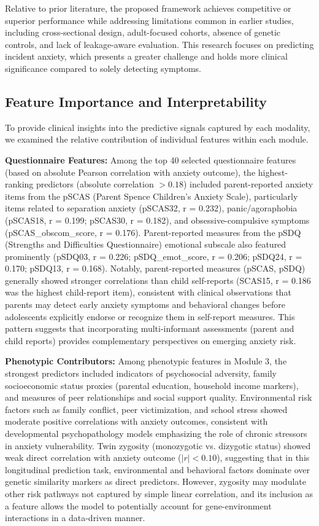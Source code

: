 \documentclass[10pt,letterpaper]{article}
\begin{document}
Relative to prior literature, the proposed framework achieves competitive or superior performance while addressing limitations common in earlier studies, including cross-sectional design, adult-focused cohorts, absence of genetic controls, and lack of leakage-aware evaluation. This research focuses on predicting incident anxiety, which presents a greater challenge and holds more clinical significance compared to solely detecting symptoms.

\subsection*{Feature Importance and Interpretability}

To provide clinical insights into the predictive signals captured by each modality, we examined the relative contribution of individual features within each module.

\textbf{Questionnaire Features:} Among the top 40 selected questionnaire features (based on absolute Pearson correlation with anxiety outcome), the highest-ranking predictors (absolute correlation $> 0.18$) included parent-reported anxiety items from the pSCAS (Parent Spence Children's Anxiety Scale), particularly items related to separation anxiety (pSCAS32, r = 0.232), panic/agoraphobia (pSCAS18, r = 0.199; pSCAS30, r = 0.182), and obsessive-compulsive symptoms (pSCAS\_obscom\_score, r = 0.176). Parent-reported measures from the pSDQ (Strengths and Difficulties Questionnaire) emotional subscale also featured prominently (pSDQ03, r = 0.226; pSDQ\_emot\_score, r = 0.206; pSDQ24, r = 0.170; pSDQ13, r = 0.168). Notably, parent-reported measures (pSCAS, pSDQ) generally showed stronger correlations than child self-reports (SCAS15, r = 0.186 was the highest child-report item), consistent with clinical observations that parents may detect early anxiety symptoms and behavioral changes before adolescents explicitly endorse or recognize them in self-report measures. This pattern suggests that incorporating multi-informant assessments (parent and child reports) provides complementary perspectives on emerging anxiety risk.

\textbf{Phenotypic Contributors:} Among phenotypic features in Module 3, the strongest predictors included indicators of psychosocial adversity, family socioeconomic status proxies (parental education, household income markers), and measures of peer relationships and social support quality. Environmental risk factors such as family conflict, peer victimization, and school stress showed moderate positive correlations with anxiety outcomes, consistent with developmental psychopathology models emphasizing the role of chronic stressors in anxiety vulnerability. Twin zygosity (monozygotic vs. dizygotic status) showed weak direct correlation with anxiety outcome ($|r| < 0.10$), suggesting that in this longitudinal prediction task, environmental and behavioral factors dominate over genetic similarity markers as direct predictors. However, zygosity may modulate other risk pathways not captured by simple linear correlation, and its inclusion as a feature allows the model to potentially account for gene-environment interactions in a data-driven manner.
\end{document}

